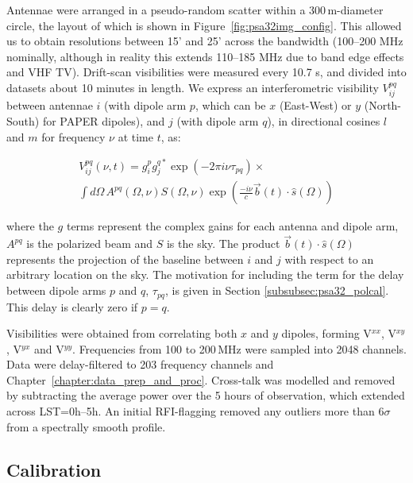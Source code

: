 Antennae were arranged in a pseudo-random scatter within a 300\,m-diameter circle, the layout of which is shown in Figure~\ref{fig:psa32img_config}. This allowed us to obtain resolutions between 15' and 25' across the bandwidth (100--200 MHz nominally, although in reality this extends 110--185 MHz due to band edge effects and VHF TV). Drift-scan visibilities were measured every 10.7 s, and divided into datasets about 10 minutes in length. We express an interferometric visibility $V^{pq}_{ij}$ between antennae $i$ (with dipole arm $p$, which can be $x$ (East-West) or $y$ (North-South) for PAPER dipoles), and $j$ (with dipole arm $q$), in directional cosines $l$ and $m$ for frequency $\nu$ at time $t$, as:

\begin{equation}
\begin{aligned}
V_{ij}^{pq}(\nu,t) = g^p_i g^{q*}_j \exp(-2\pi i \nu \tau_{pq}) \times \\ \int d\Omega \, A^{pq}(\Omega, \nu)
S(\Omega, \nu) \exp\left(\frac{ -i\nu}{c} \vec{b}(t) \cdot \hat{s}(\Omega)\right)
\end{aligned}
\label{eq:psa32_visibility}
\end{equation}

where the $g$ terms represent the complex gains for each antenna and dipole arm, $A^{pq}$ is the polarized beam and $S$ is the sky. The product $\vec{b}(t) \cdot \hat{s}(\Omega)$ represents the projection of the baseline between $i$ and $j$ with respect to an arbitrary location on the sky. 
The motivation for including the term for the delay between dipole arms $p$ and $q$, $\tau_{pq}$, is given in Section \ref{subsubsec:psa32_polcal}. This delay is clearly zero if $p=q$.

Visibilities were obtained from correlating both $x$ and $y$ dipoles, forming V$^{xx}$, V$^{xy}$, V$^{yx}$ and V$^{yy}$. Frequencies from 100 to 200\,MHz were sampled into 2048 channels.
Data were delay-filtered to 203 frequency channels \citep[see the Appendix of][]{Parsons.14} and Chapter~\ref{chapter:data_prep_and_proc}.  Cross-talk was modelled and removed by subtracting the average power over the 5 hours of observation, which extended across LST=0h--5h. An initial RFI-flagging removed any outliers more than $6\sigma$ from a spectrally smooth profile.

\subsection{Calibration}

